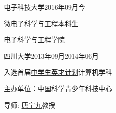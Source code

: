 
\begin{eduitem}{电子科技大学}{}{2016年09月}{今}
\item 微电子科学与工程本科生
\item 电子科学与工程学院
\end{eduitem}

\begin{eduitem}{四川大学}{}{2013年09月}{2014年06月}
\item 入选首届\href{http://ycjh.org}{中学生英才计划}计算机学科
\item 主办单位：中国科学青少年科技中心
\item 导师: \href{http://cs.scu.edu.cn/info/1074/3930.htm}{唐宁九}教授
\end{eduitem}


\endinput